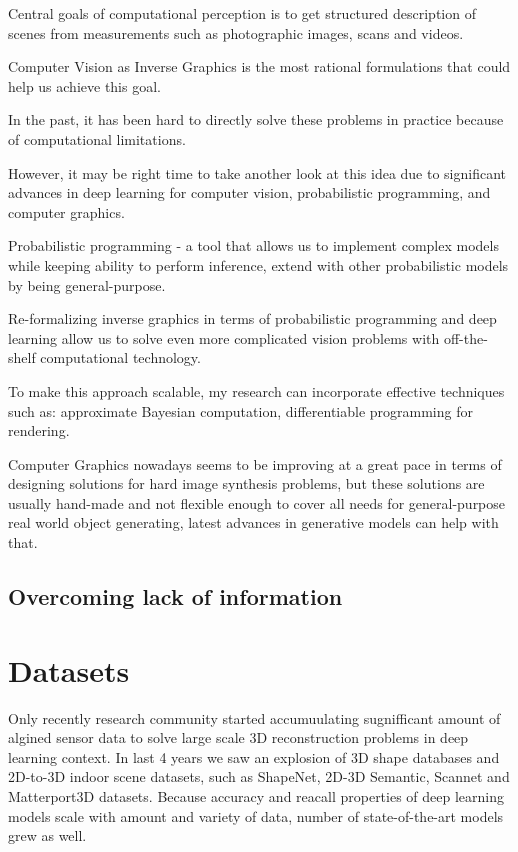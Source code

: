 Central goals of computational perception is to get structured description of scenes from measurements such as photographic images, scans and videos.

Computer Vision as Inverse Graphics is the most rational formulations that could help us achieve this goal.

In the past, it has been hard to directly solve these problems in practice because of computational limitations.

However, it may be right time to take another look at this idea due to significant advances in deep learning for computer vision, probabilistic programming, and computer graphics.

Probabilistic programming - a tool that allows us to implement complex models while keeping ability to perform inference, extend with other probabilistic models by being general-purpose.

Re-formalizing inverse graphics in terms of probabilistic programming and deep learning allow us to solve even more complicated vision problems with off-the-shelf computational technology.

To make this approach scalable, my research can incorporate effective techniques such as: approximate Bayesian computation, differentiable programming for rendering.

Computer Graphics nowadays seems to be improving at a great pace in terms of designing solutions for hard image synthesis problems, but these solutions are usually hand-made and not flexible enough to cover all needs for general-purpose real world object generating, latest advances in generative models can help with that.


\subsection{Overcoming lack of information}

\section{Datasets}

Only recently research community started accumuulating sugnifficant amount of algined sensor data to solve large scale 3D reconstruction problems in deep learning context. In last 4 years we saw an explosion of 3D shape databases and 2D-to-3D indoor scene datasets, such as ShapeNet, 2D-3D Semantic, Scannet and Matterport3D datasets. Because accuracy and reacall properties of deep learning models scale with amount and variety of data, number of state-of-the-art models grew as well.


